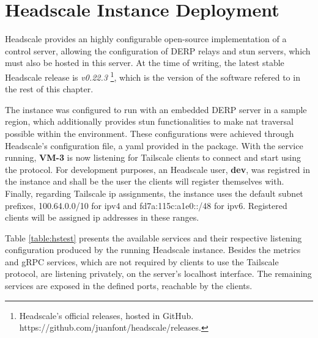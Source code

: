 \documentclass[11pt,twoside,a4paper]{report}
\begin{document}
\section{Headscale Instance Deployment}
\label{sec:devhs}

Headscale provides an highly configurable open-source implementation of a control server, allowing the configuration of \ac{DERP} relays and \ac{stun} servers, which must also be hosted in this server. At the time of writing, the latest stable Headscale release is \emph{v0.22.3} \footnote{Headscale's official releases, hosted in GitHub. https://github.com/juanfont/headscale/releases.}, which is the version of the software refered to in the rest of this chapter.

The instance was configured to run with an embedded \ac{DERP} server in a sample region, which additionally provides \ac{stun} functionalities to make \ac{nat} traversal possible within the environment. These configurations were achieved through Headscale's configuration file, a yaml provided in the package. With the service running, \textbf{VM-3} is now listening for Tailscale clients to connect and start using the protocol. For development purposes, an Headscale user, \textbf{dev}, was registred in the instance and shall be the user the clients will register themselves with. Finally, regarding Tailscale \ac{ip} assignments, the instance uses the default subnet prefixes, 100.64.0.0/10 for ipv4 and fd7a:115c:a1e0::/48 for ipv6. Registered clients will be assigned \ac{ip} addresses in these ranges.

Table \ref{table:hstest} presents the available services and their respective listening configuration produced by the running Headscale instance. Besides the metrics and gRPC services, which are not required by clients to use the Tailscale protocol, are listening privately, on the server's localhost interface. The remaining services are exposed in the defined ports, reachable by the clients.

\begin{table}[]
\centering
{}
\caption{Services running in the Headscale instance}
\label{table:hstest}
\end{table}
\end{document}
